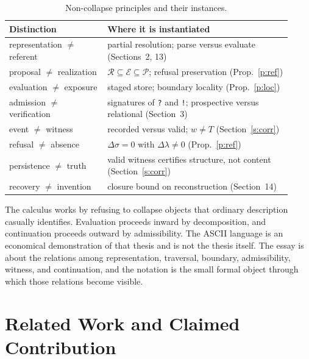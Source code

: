 \documentclass[11pt]{article}
\newcommand{\code}[1]{\texttt{#1}}
\begin{document}
\begin{table}[h]
\centering
\small
\begin{tabular}{@{}p{0.32\linewidth}p{0.6\linewidth}@{}}
\toprule
Distinction & Where it is instantiated \\
\midrule
representation $\neq$ referent & partial resolution; parse versus evaluate (Sections~2, 13) \\
proposal $\neq$ realization & $\mathcal R\subseteq\mathcal E\subseteq\mathcal P$; refusal preservation (Prop.~\ref{p:ref}) \\
evaluation $\neq$ exposure & staged store; boundary locality (Prop.~\ref{p:loc}) \\
admission $\neq$ verification & signatures of \code{?} and \code{!}; prospective versus relational (Section~3) \\
event $\neq$ witness & recorded versus valid; $w\neq T$ (Section~\ref{s:corr}) \\
refusal $\neq$ absence & $\Delta\sigma=0$ with $\Delta\lambda\neq0$ (Prop.~\ref{p:ref}) \\
persistence $\neq$ truth & valid witness certifies structure, not content (Section~\ref{s:corr}) \\
recovery $\neq$ invention & closure bound on reconstruction (Section~14) \\
\bottomrule
\end{tabular}
\caption{Non-collapse principles and their instances.}
\end{table}

The calculus works by refusing to collapse objects that ordinary description casually identifies. Evaluation proceeds inward by decomposition, and continuation proceeds outward by admissibility. The ASCII language is an economical demonstration of that thesis and is not the thesis itself. The essay is about the relations among representation, traversal, boundary, admissibility, witness, and continuation, and the notation is the small formal object through which those relations become visible.

\section{Related Work and Claimed Contribution}
\end{document}
